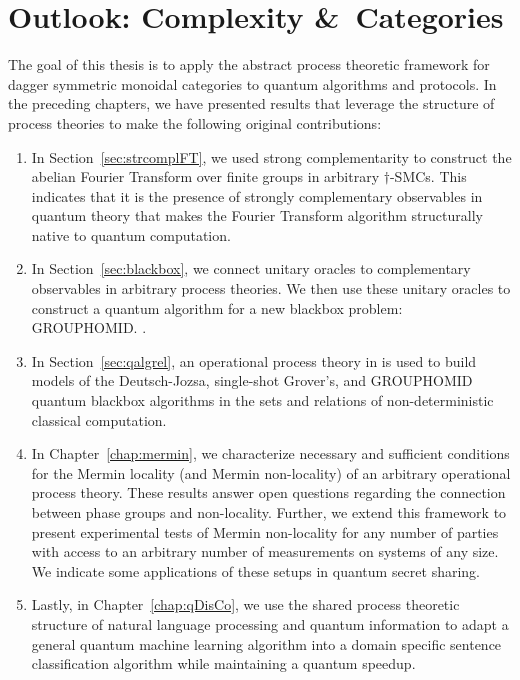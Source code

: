 \chapter{Outlook: Complexity \&\ Categories}
\label{chap:outlook}

The goal of this thesis is to apply the abstract process theoretic framework for dagger symmetric monoidal categories to quantum algorithms and protocols.  In the preceding chapters, we have presented results that leverage the structure of process theories to make the following original contributions:
\begin{enumerate}
\item In Section~\ref{sec:strcomplFT}, we used strong complementarity to construct the abelian Fourier Transform over finite groups in arbitrary $\dagger$-SMCs. This indicates that it is the presence of strongly complementary observables in quantum theory that makes the Fourier Transform algorithm structurally native to quantum computation.

\item In Section~\ref{sec:blackbox}, we connect unitary oracles to complementary observables in arbitrary process theories. We then use these unitary oracles to construct a quantum algorithm for a new blackbox problem: GROUPHOMID. .

\item In Section~\ref{sec:qalgrel}, an operational process theory in  is used to build models of the Deutsch-Jozsa, single-shot Grover's, and GROUPHOMID quantum blackbox algorithms in the sets and relations of non-deterministic classical computation.

\item In Chapter~\ref{chap:mermin}, we characterize necessary and sufficient conditions for the Mermin locality (and Mermin non-locality) of an arbitrary operational process theory. These results answer open questions regarding the connection between phase groups and non-locality. Further, we extend this framework to present experimental tests of Mermin non-locality for any number of parties with access to an arbitrary number of measurements on systems of any size. We indicate some applications of these setups in quantum secret sharing.

\item Lastly, in Chapter~\ref{chap:qDisCo}, we use the shared process theoretic structure of natural language processing and quantum information to adapt a general quantum machine learning algorithm into a domain specific sentence classification algorithm while maintaining a quantum speedup.
\end{enumerate}

